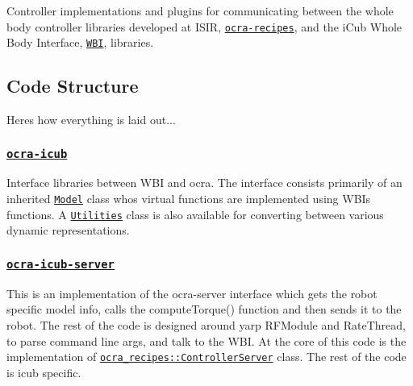\href{https://travis-ci.org/ocra-recipes/ocra-wbi-plugins}{\tt }

Controller implementations and plugins for communicating between the whole body controller libraries developed at I\+S\+IR, \href{https://github.com/ocra-recipes/ocra-recipes}{\tt {\ttfamily ocra-\/recipes}}, and the i\+Cub Whole Body Interface, \href{https://github.com/robotology/wholebodyinterface}{\tt {\ttfamily W\+BI}}, libraries.

\subsection*{Code Structure}

Here\textquotesingle{}s how everything is laid out...

\subsubsection*{\href{https://github.com/ocra-recipes/ocra-wbi-plugins/tree/master/ocra-icub}{\tt ocra-\/icub}}

Interface libraries between W\+BI and ocra. The interface consists primarily of an inherited \href{https://github.com/ocra-recipes/ocra-wbi-plugins/tree/master/ocra-icub/src/ocraWbiModel.cpp}{\tt {\ttfamily Model}} class who\textquotesingle{}s virtual functions are implemented using W\+BI\textquotesingle{}s functions. A \href{https://github.com/ocra-recipes/ocra-wbi-plugins/tree/master/ocra-icub/src/Utilities.cpp}{\tt {\ttfamily Utilities}} class is also available for converting between various dynamic representations.

\subsubsection*{\href{https://github.com/ocra-recipes/ocra-wbi-plugins/tree/master/ocra-icub-server}{\tt ocra-\/icub-\/server}}

This is an implementation of the ocra-\/server interface which gets the robot specific model info, calls the {\ttfamily compute\+Torque()} function and then sends it to the robot. The rest of the code is designed around yarp {\ttfamily R\+F\+Module} and {\ttfamily Rate\+Thread}, to parse command line args, and talk to the W\+BI. At the core of this code is the implementation of \href{https://github.com/ocra-recipes/ocra-recipes/tree/master/ocra-recipes/src/ContControllerServer.cpp}{\tt {\ttfamily ocra\+\_\+recipes\+::\+Controller\+Server}} class. The rest of the code is icub specific.

